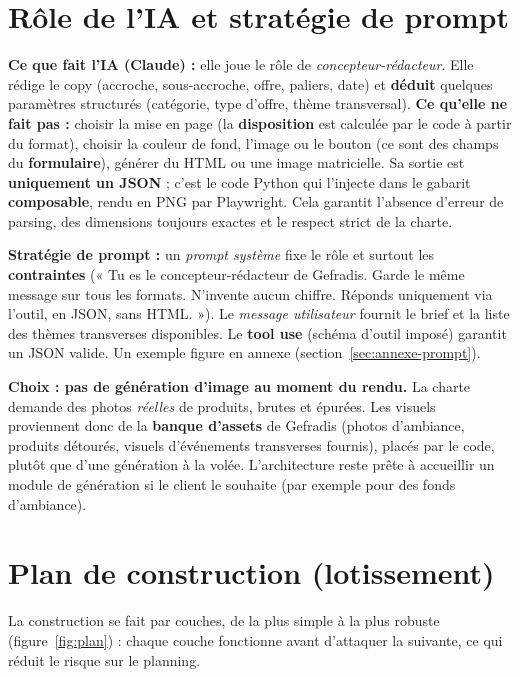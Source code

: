 \documentclass[11pt,a4paper]{article}
\begin{document}
\section{Rôle de l'IA et stratégie de prompt}
\textbf{Ce que fait l'IA (Claude) :} elle joue le rôle de \emph{concepteur-rédacteur}.
Elle rédige le copy (accroche, sous-accroche, offre, paliers, date) et \textbf{déduit} quelques
paramètres structurés (catégorie, type d'offre, thème transversal). \textbf{Ce qu'elle
ne fait pas :} choisir la mise en page (la \textbf{disposition} est calculée par le
code à partir du format), choisir la couleur de fond, l'image ou le bouton (ce sont des
champs du \textbf{formulaire}), générer du HTML ou une image matricielle. Sa sortie est
\textbf{uniquement un JSON} ; c'est le code Python qui l'injecte dans le gabarit
\textbf{composable}, rendu en PNG par Playwright. Cela garantit l'absence d'erreur de
parsing, des dimensions toujours exactes et le respect strict de la charte.

\textbf{Stratégie de prompt :} un \emph{prompt système} fixe le rôle et surtout les
\textbf{contraintes} (« Tu es le concepteur-rédacteur de Gefradis. Garde le même
message sur tous les formats. N'invente aucun chiffre. Réponds uniquement via
l'outil, en JSON, sans HTML. »). Le \emph{message utilisateur} fournit le brief et la
liste des thèmes transverses disponibles. Le \textbf{tool use} (schéma d'outil imposé)
garantit un JSON valide. Un exemple figure en annexe (section~\ref{sec:annexe-prompt}).

\textbf{Choix : pas de génération d'image au moment du rendu.} La charte demande des
photos \emph{réelles} de produits, brutes et épurées. Les visuels proviennent donc de
la \textbf{banque d'assets} de Gefradis (photos d'ambiance, produits détourés, visuels
d'événements transverses fournis), placés par le code, plutôt que d'une génération à
la volée. L'architecture reste prête à accueillir un module de génération si le client
le souhaite (par exemple pour des fonds d'ambiance).

\section{Plan de construction (lotissement)}
La construction se fait par couches, de la plus simple à la plus robuste
(figure~\ref{fig:plan}) : chaque couche fonctionne avant d'attaquer la suivante,
ce qui réduit le risque sur le planning.
\end{document}
